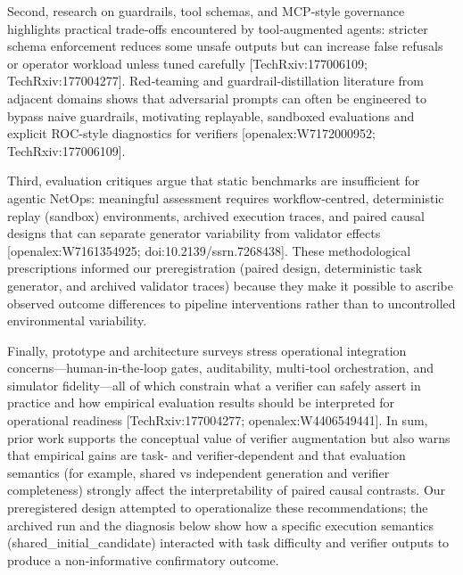 \documentclass[conference]{IEEEtran}
\begin{document}
Second, research on guardrails, tool schemas, and MCP‑style governance highlights practical trade‑offs encountered by tool‑augmented agents: stricter schema enforcement reduces some unsafe outputs but can increase false refusals or operator workload unless tuned carefully [TechRxiv:177006109; TechRxiv:177004277]. Red‑teaming and guardrail‑distillation literature from adjacent domains shows that adversarial prompts can often be engineered to bypass naive guardrails, motivating replayable, sandboxed evaluations and explicit ROC‑style diagnostics for verifiers [openalex:W7172000952; TechRxiv:177006109].

Third, evaluation critiques argue that static benchmarks are insufficient for agentic NetOps: meaningful assessment requires workflow‑centred, deterministic replay (sandbox) environments, archived execution traces, and paired causal designs that can separate generator variability from validator effects [openalex:W7161354925; doi:10.2139/ssrn.7268438]. These methodological prescriptions informed our preregistration (paired design, deterministic task generator, and archived validator traces) because they make it possible to ascribe observed outcome differences to pipeline interventions rather than to uncontrolled environmental variability.

Finally, prototype and architecture surveys stress operational integration concerns---human‑in‑the‑loop gates, auditability, multi‑tool orchestration, and simulator fidelity---all of which constrain what a verifier can safely assert in practice and how empirical evaluation results should be interpreted for operational readiness [TechRxiv:177004277; openalex:W4406549441]. In sum, prior work supports the conceptual value of verifier augmentation but also warns that empirical gains are task‑ and verifier‑dependent and that evaluation semantics (for example, shared vs independent generation and verifier completeness) strongly affect the interpretability of paired causal contrasts. Our preregistered design attempted to operationalize these recommendations; the archived run and the diagnosis below show how a specific execution semantics (shared\_initial\_candidate) interacted with task difficulty and verifier outputs to produce a non‑informative confirmatory outcome.
\end{document}
